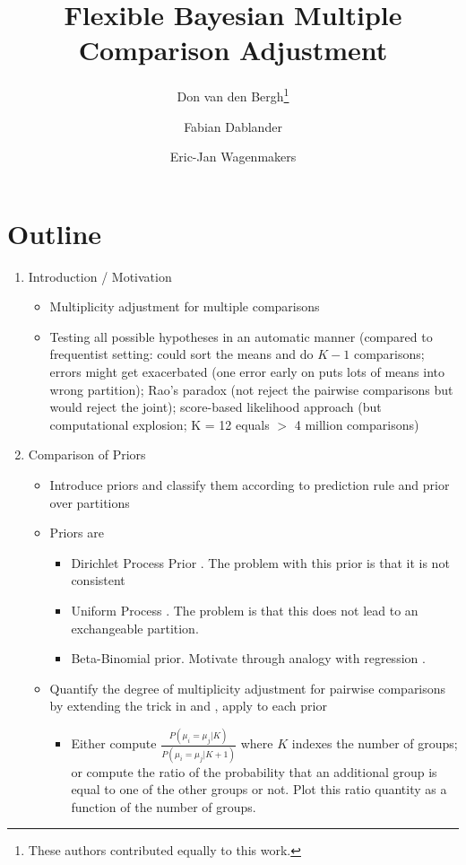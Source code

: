 \documentclass[11pt,a4paper]{article}
\date{}
\title{Flexible Bayesian Multiple Comparison Adjustment}
\author[1]{Don van den Bergh\thanks{These authors contributed equally to this work.}}
\author[1]{Fabian Dablander\samethanks[1]}
\author[1]{Eric-Jan Wagenmakers}
\affil[1]{Department of Psychological Methods, University of Amsterdam}
\theoremstyle{definition} %
\theoremstyle{case}
\begin{document}
\maketitle

\section*{Outline}
\begin{enumerate}
    \item Introduction / Motivation
    \begin{itemize}
        \item Multiplicity adjustment for multiple comparisons
        \item Testing all possible hypotheses in an automatic manner (compared to frequentist setting: could sort the means and do $K - 1$ comparisons; errors might get exacerbated (one error early on puts lots of means into wrong partition); Rao's paradox (not reject the pairwise comparisons but would reject the joint); score-based likelihood approach (but computational explosion; K = 12 equals $>$ 4 million comparisons)
    \end{itemize}
    \item Comparison of Priors
    \begin{itemize}
        \item Introduce priors and classify them according to prediction rule and prior over partitions
        \item Priors are
        \begin{itemize}
            \item Dirichlet Process Prior \parencite{gopalan1998bayesian}. The problem with this prior is that it is not consistent \parencite{miller2013simple, miller2018mixture}
            \item Uniform Process \parencite{wallach2010alternative}. The problem is that this does not lead to an exchangeable partition.
            \item Beta-Binomial prior. Motivate through analogy with regression \parencite{scott2006exploration, scott2010bayes}.
        \end{itemize}
        \item Quantify the degree of multiplicity adjustment for pairwise comparisons by extending the trick in \textcite{scott2010bayes} and \textcite{li2016role}, apply to each prior
        \begin{itemize}
            \item Either compute $\frac{P(\mu_i = \mu_j | K)}{P(\mu_i = \mu_j | K + 1)}$ where $K$ indexes the number of groups; or compute the ratio of the probability that an additional group is equal to one of the other groups or not. Plot this ratio quantity as a function of the number of groups.

\end{itemize}
\end{itemize}
\end{enumerate}
\end{document}
